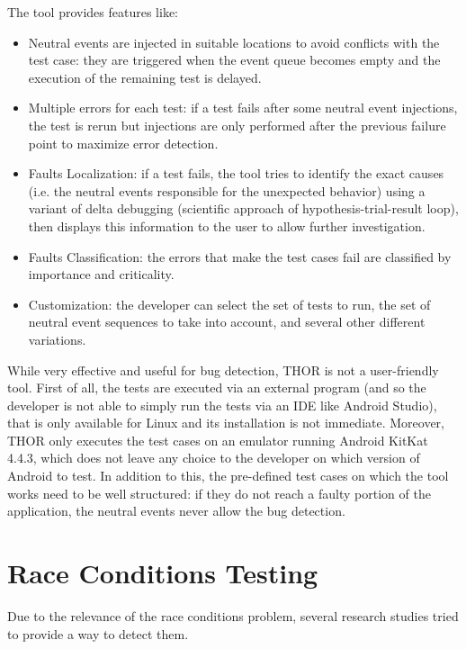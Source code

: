 \documentclass[11pt,a4paper,notitlepage]{article}
\begin{document}
The tool provides features like:
\begin{itemize}
	\item Neutral events are injected in suitable locations to avoid conflicts with the test case: they are triggered when the event queue becomes empty and the execution of the remaining test is delayed.
	\item Multiple errors for each test: if a test fails after some neutral event injections, the test is rerun but injections are only performed after the previous failure point to maximize error detection.
	\item Faults Localization: if a test fails, the tool tries to identify the exact causes (i.e. the neutral events responsible for the unexpected behavior) using a variant of delta debugging (scientific approach of hypothesis-trial-result loop), then displays this information to the user to allow further investigation.
	\item Faults Classification: the errors that make the test cases fail are classified by importance and criticality.
	\item Customization: the developer can select the set of tests to run,
the set of neutral event sequences to take into account, and
several other different variations.
\end{itemize}
While very effective and useful for bug detection, THOR is not a user-friendly tool. First of all, the tests are executed via an external program (and so the developer is not able to simply run the tests via an IDE like Android Studio), that is only available for Linux and its installation is not immediate. Moreover, THOR only executes the test cases on an emulator running Android KitKat 4.4.3, which does not leave any choice to the developer on which version of Android to test. In addition to this, the pre-defined test cases on which the tool works need to be well structured: if they do not reach a faulty portion of the application, the neutral events never allow the bug detection.

\section{Race Conditions Testing}\label{section_race_tools}
Due to the relevance of the race conditions problem, several research studies tried to provide a way to detect them.
\end{document}

